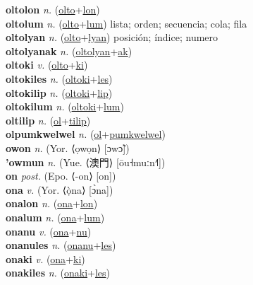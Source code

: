 \textbf{oltolon} \textit{n.} (\hyperref[olto]{olto}+\hyperref[lon]{lon})
 \label{oltolon} \\
\textbf{oltolum} \textit{n.} (\hyperref[olto]{olto}+\hyperref[lum]{lum})
lista; orden; secuencia; cola; fila \label{oltolum} \\
\textbf{oltolyan} \textit{n.} (\hyperref[olto]{olto}+\hyperref[lyan]{lyan})
posición; índice; numero \label{oltolyan} \\
\textbf{oltolyanak} \textit{n.} (\hyperref[oltolyan]{oltolyan}+\hyperref[ak]{ak})
 \label{oltolyanak} \\
\textbf{oltoki} \textit{v.} (\hyperref[olto]{olto}+\hyperref[ki]{ki})
 \label{oltoki} \\
\textbf{oltokiles} \textit{n.} (\hyperref[oltoki]{oltoki}+\hyperref[les]{les})
 \label{oltokiles} \\
\textbf{oltokilip} \textit{n.} (\hyperref[oltoki]{oltoki}+\hyperref[lip]{lip})
 \label{oltokilip} \\
\textbf{oltokilum} \textit{n.} (\hyperref[oltoki]{oltoki}+\hyperref[lum]{lum})
 \label{oltokilum} \\
\textbf{oltilip} \textit{n.} (\hyperref[ol]{ol}+\hyperref[tilip]{tilip})
 \label{oltilip} \\
\textbf{olpumkwelwel} \textit{n.} (\hyperref[ol]{ol}+\hyperref[pumkwelwel]{pumkwelwel})
 \label{olpumkwelwel} \\
\textbf{owon} \textit{n.} (Yor. ⟨ọwọn⟩ [ɔwɔ̃])
 \label{owon} \\
\textbf{'owmun} \textit{n.} (Yue. ⟨澳門⟩ [ōu˧muːn˧˥])
 \label{'owmun} \\
\textbf{on} \textit{post.} (Epo. ⟨-on⟩ [on])
 \label{on} \\
\textbf{ona} \textit{v.} (Yor. ⟨ọ̀na⟩ [ɔ̀na])
 \label{ona} \\
\textbf{onalon} \textit{n.} (\hyperref[ona]{ona}+\hyperref[lon]{lon})
 \label{onalon} \\
\textbf{onalum} \textit{n.} (\hyperref[ona]{ona}+\hyperref[lum]{lum})
 \label{onalum} \\
\textbf{onanu} \textit{v.} (\hyperref[ona]{ona}+\hyperref[nu]{nu})
 \label{onanu} \\
\textbf{onanules} \textit{n.} (\hyperref[onanu]{onanu}+\hyperref[les]{les})
 \label{onanules} \\
\textbf{onaki} \textit{v.} (\hyperref[ona]{ona}+\hyperref[ki]{ki})
 \label{onaki} \\
\textbf{onakiles} \textit{n.} (\hyperref[onaki]{onaki}+\hyperref[les]{les})
 \label{onakiles} \\
